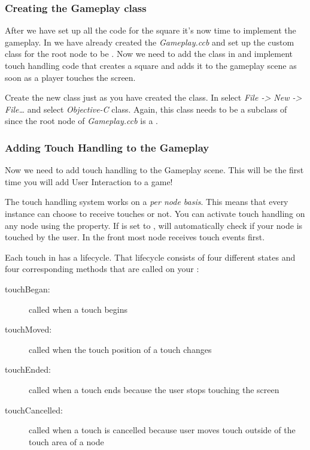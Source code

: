 \subsubsection{Creating the Gameplay class}

After we have set up all the code for the square it's now time to implement the
gameplay. In \SB{} we have already created the \ccbfile{} \textit{Gameplay.ccb}
and set up the custom class for the root node to be . Now we need to add the
 class in \xcode{} and implement touch handling code that
creates a square and adds it to the gameplay scene as soon as a player touches
the screen.

Create the new class just as you have created the  class. In
\xcode{} select \textit{File -> New -> File\ldots} and select
\textit{Objective-C} class. Again, this class needs to be a subclass of
\ccnode{} since the root node of \textit{Gameplay.ccb} is a \ccnode{}.

\subsubsection{Adding Touch Handling to the Gameplay}
Now we need to add touch handling to the Gameplay scene. This will be the first
time you will add User Interaction to a \cocos{} game! 

The \cocos{} touch handling system works on a \textit{per node
basis}.
This means that every \ccnode{} instance can choose to receive touches or not. You
can activate touch handling on any node using the
 property. If
 is set to , \cocos{} will
automatically check if your node is touched by the user. In \cocos{} the front
most node receives touch events first.

Each touch in \cocos{} has a lifecycle. That lifecycle consists of four
different states and four corresponding methods that are called on your
\ccnode{}:

\begin{description}
\item[touchBegan:] called when a touch begins
\item[touchMoved:] called when the touch position of a touch changes
\item[touchEnded:] called when a touch ends because the user stops touching the
screen
\item[touchCancelled:] called when a touch is cancelled because user moves touch
outside of the touch area of a node
\end{description}


